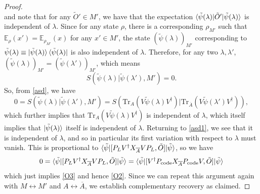 \documentclass[12pt,a4paper]{report}
\numberwithin{equation}{section}
\newcommand{\ketbra}[2]{\ket{#1}\bra{#2}}
\newcommand{\ketbras}[1]{\ketbra{#1}{#1}}
\newcommand{\Pc}{P_{\text{code}}}
\newcommand{\ol}[1]{\overline{#1}}
\newcommand{\tr}{\text{Tr}}
\theoremstyle{definition}
\theoremstyle{theorem}
\theoremstyle{theorem}
\theoremstyle{example}
\theoremstyle{definition}
\begin{document}
\begin{proof}
\begin{equation}
	\end{equation}
	and note that for any $\tilde{O}'\in M'$, we have that the expectation $\braket{\tilde{\psi}(\lambda)|\tilde{O}'|\tilde{\psi}(\lambda)}$ is independent of $\lambda$. Since for any state $\rho$, there is a corresponding $\rho_{M'}$ such that $\mathbb{E}_{\rho}(x')=\mathbb{E}_{\rho_{M'}}(x)$ for any $x'\in M'$, the state $(\tilde{\psi}(\lambda))_{M'}$ corresponding to $\tilde{\psi}(\lambda)\equiv\ketbras{\tilde{\psi}(\lambda)}$ is also independent of $\lambda$. Therefore, for any two $\lambda,\lambda'$, $(\tilde{\psi}(\lambda))_{M'}=(\tilde{\psi}(\lambda'))_{M'}$, which means
	\begin{equation}
		S(\tilde{\psi}(\lambda)|\tilde{\psi}(\lambda'),M')=0.
	\end{equation}
	So, from \ref{asd}, we have
	\begin{equation}
		0=S(\tilde{\psi}(\lambda)|\tilde{\psi}(\lambda'),M')=S(\tr_{{A}}(V\tilde{\psi}(\lambda) V^{\dagger})|\tr_{\ol{A}}(V\tilde{\psi}(\lambda') V^{\dagger})),
	\end{equation}
	which further implies that $\tr_{A}(V\tilde{\psi}(\lambda)V^{\dagger})$ is independent of $\lambda$, which itself implies that $\ket{\tilde{\psi}(\lambda)}$ itself is independent of $\lambda$. Returning to \ref{asd1}, we see that it is independent of $\lambda$, and so in particular its first variation with respect to $\lambda$ must vanish. This is proportional to $\braket{\tilde{\psi}|[P_{L}V^{\dagger}X_{\ol{A}}VP_{L},\tilde{O}]|\tilde{\psi}}$, so we have
	\begin{equation}
		0=\braket{\tilde{\psi}|[P_{L}V^{\dagger}X_{\ol{A}}VP_{L},\tilde{O}]|\tilde{\psi}}=\braket{\tilde{\psi}|[V^{\dagger}\Pc X_{\ol{A}}\Pc V,\tilde{O}]|\tilde{\psi}}
	\end{equation}
	which just implies \ref{O3} and hence \ref{O2}. Since we can repeat this argument again with $M\leftrightarrow M'$ and $A\leftrightarrow \ol{A}$, we establish complementary recovery as claimed.
\end{proof}
\end{document}
